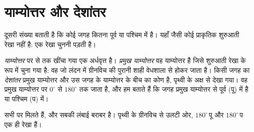 \section{याम्योत्तर और देशांतर}

दूसरी संख्या बताती है कि कोई जगह कितना पूर्व या पश्चिम में है। यहाँ  जैसी
कोई प्राकृतिक शुरुआती रेखा नहीं है: एक रेखा चुननी पड़ती है।

\begin{definition}[याम्योत्तर, देशांतर और प्रमुख याम्योत्तर]\label{def:g6:latitude-longitude:longitude}
\emph{याम्योत्तर}  पर  से  तक खींचा
गया एक अर्धवृत्त है। \emph{प्रमुख याम्योत्तर}
वह याम्योत्तर है जिसे शुरुआती रेखा के रूप में चुना गया है: वह जो लंदन में ग्रीनविच की
पुरानी शाही वेधशाला से होकर जाता है। किसी जगह का
\emph{देशांतर} प्रमुख याम्योत्तर और उस जगह के याम्योत्तर के बीच
का कोण है, पृथ्वी के अक्ष से देखा गया। वह प्रमुख याम्योत्तर पर $0^\circ$ से
$180^\circ$ तक जाता है, और हम बताते हैं कि जगह प्रमुख याम्योत्तर से पूर्व (पू) में
है या पश्चिम (प) में।
\end{definition}

सभी   पर मिलते हैं, और सबकी लंबाई बराबर है। पृथ्वी के ग्रीनविच से
उलटी ओर,  $180^\circ$\,पू और  $180^\circ$\,प
एक ही रेखा हैं।

